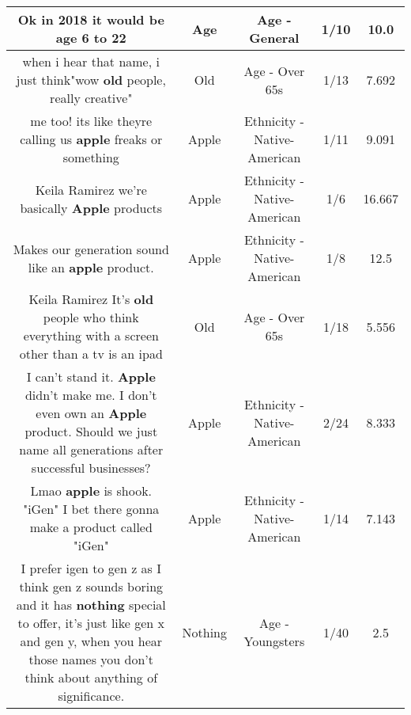 \documentclass[11pt]{article}
\newlength\mylength
\begin{document}
\begin{center}
\begin{longtable}{|C{.65\mylength}|C{.30\mylength}|C{.12\mylength}|C{.12\mylength}|C{.12\mylength}|}
  \small Ok in 2018 it would be \textbf{age} 6 to 22\normalsize   & Age & Age - General & 1/10 & 10.0 \\  \hline
  \small when i hear that name, i just think"wow \textbf{old} people, really creative"\normalsize   & Old & Age - Over 65s & 1/13 & 7.692 \\  \hline
  \small me too! its like theyre calling us \textbf{apple} freaks or something\normalsize   & Apple & Ethnicity - Native-American & 1/11 & 9.091 \\  \hline
  \small Keila Ramirez we're basically \textbf{Apple} products\normalsize   & Apple & Ethnicity - Native-American & 1/6 & 16.667 \\  \hline
  \small Makes our generation sound like an \textbf{apple} product.\normalsize   & Apple & Ethnicity - Native-American & 1/8 & 12.5 \\  \hline
  \small Keila Ramirez It's \textbf{old} people who think everything with a screen other than a tv is an ipad\normalsize   & Old & Age - Over 65s & 1/18 & 5.556 \\  \hline
  \small I can't stand it. \textbf{Apple} didn't make me. I don't even own an \textbf{Apple} product. Should we just name all generations after successful businesses?\normalsize   & Apple & Ethnicity - Native-American & 2/24 & 8.333 \\  \hline
  \small Lmao \textbf{apple} is shook. "iGen" I bet there gonna make a product called "iGen"\normalsize   & Apple & Ethnicity - Native-American & 1/14 & 7.143 \\  \hline
  \small I prefer igen to gen z as I think gen z sounds boring and it has \textbf{nothing} special to offer, it's just like gen x and gen y, when you hear those names you don't think about anything of significance.\normalsize   & Nothing & Age - Youngsters & 1/40 & 2.5 \\  \hline

\end{longtable}
\end{center}
\end{document}
